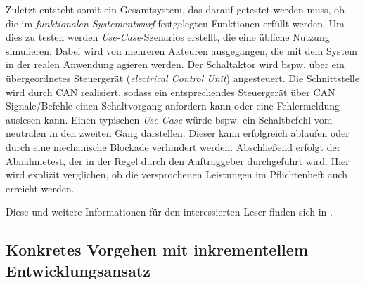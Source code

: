 Zuletzt entsteht somit ein Gesamtsystem, das darauf getestet werden muss, ob die im \textit{funktionalen Systementwurf} festgelegten Funktionen erfüllt werden. Um dies zu testen werden \textit{Use-Case}-Szenarios erstellt, die eine übliche Nutzung simulieren. Dabei wird von mehreren Akteuren ausgegangen, die mit dem System in der realen Anwendung agieren werden. Der Schaltaktor wird bspw. über ein übergeordnetes Steuergerät (\textit{electrical Control Unit}) angesteuert. Die Schnittstelle wird durch CAN realisiert, sodass ein entsprechendes Steuergerät über CAN Signale/Befehle einen Schaltvorgang anfordern kann oder eine Fehlermeldung auslesen kann. Einen typischen \textit{Use-Case} würde bspw. ein Schaltbefehl vom neutralen in den zweiten Gang darstellen. Dieser kann erfolgreich ablaufen oder durch eine mechanische Blockade verhindert werden. Abschließend erfolgt der Abnahmetest, der in der Regel durch den Auftraggeber durchgeführt wird. Hier wird explizit verglichen, ob die versprochenen Leistungen im Pflichtenheft auch erreicht werden.

Diese und weitere Informationen für den interessierten Leser finden sich in \cite{BasSof}.

\subsection{Konkretes Vorgehen mit inkrementellem Entwicklungsansatz}

